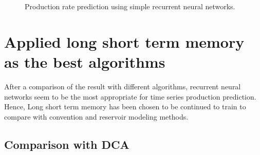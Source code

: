 \documentclass[12pt,a4paper]{report}
\begin{document}
\begin{figure}[H]
     \begin{center}
%
    \end{center}
    \caption{%
        Production rate prediction using simple recurrent neural networks.
     }%
   \label{fig:subfigures}
\end{figure}
 



\section{Applied long short term memory as the best algorithms}
After a comparison of the result with different algorithms, recurrent neural networks seem to be the most appropriate for time series production prediction. Hence, Long short term memory has been chosen to be continued to train to compare with convention and reservoir modeling methods. 
\subsection{Comparison with DCA}
\end{document}

